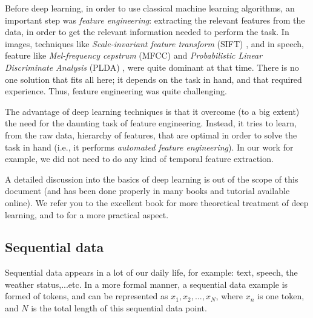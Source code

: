 
\par Before deep learning, in order to use classical machine learning algorithms, an important step was \textit{feature engineering}: extracting the relevant features from the data, in order to get the relevant information needed to perform the task. In images, techniques like \textit{Scale-invariant feature transform} (SIFT) \citep{lowe1999object}, and in speech, feature like \textit{Mel-frequency cepstrum} (MFCC) and \textit{Probabilistic  Linear  Discriminate  Analysis} (PLDA) \citep{narang2015speech}, were quite dominant at that time. There is no one solution that fits all here; it depends on the task in hand, and that required experience. Thus, feature engineering was quite challenging.

The advantage of deep learning techniques is that it overcome (to a big extent) the need for the daunting task of feature engineering. Instead, it tries to learn, from the raw data, hierarchy of features, that are optimal in order to solve the task in hand (i.e., it performs \textit{automated feature engineering}). In our work for example, we did not need to do any kind of temporal feature extraction.

\par A detailed discussion into the basics of deep learning is out of the scope of this document (and has been done properly in many books and tutorial available online). We refer you to the excellent book \citep{Goodfellow-et-al-2016} for more theoretical treatment of deep learning, and to \citep{chollet2017book,geron2017hands} for a more practical aspect.

\subsection{Sequential data} \label{sec:seq_data}
\par Sequential data appears in a lot of our daily life, for example: text, speech, the weather status,...etc. In a more formal manner, a sequential data example is formed of tokens, and can be represented as $x_1, x_2, ..., x_N$, where $x_n$ is one token, and $N$ is the total length of this sequential data point.

